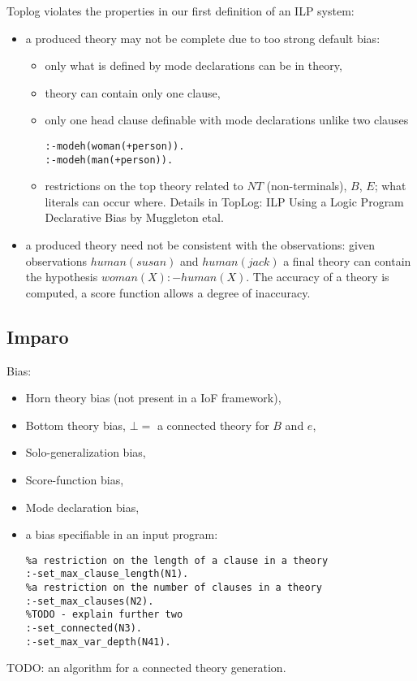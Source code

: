 Toplog violates the properties in our first definition of an ILP system:
\begin{itemize}
\item a produced theory may not be complete due to too strong default bias:
\begin{itemize}
\item only what is defined by mode declarations can be in theory,
\item theory can contain only one clause,
\item only one head clause definable with mode declarations unlike two clauses
\begin{lstlisting}
:-modeh(woman(+person)).
:-modeh(man(+person)).
\end{lstlisting}

\item restrictions on the top theory related to $NT$ (non-terminals), $B$, $E$; what literals can occur where. Details in TopLog: ILP Using a Logic Program Declarative Bias by Muggleton etal.
\end{itemize}
\item a produced theory need not be consistent with the observations: given observations $human(susan)$ and $human(jack)$ a final theory can contain the hypothesis $woman(X) :- human(X)$. The accuracy of a theory is computed, a score function allows a degree of inaccuracy.
\end{itemize}

\iffalse
\subsection{ProGolem}
\begin{itemize}
\item Inverse Entailment,
\item co-generalization, 
\end{itemize}
\fi

\subsection{Imparo\cite{kimber2009}}
Bias:
\begin{itemize}
\item Horn theory bias (not present in a IoF framework),
\item Bottom theory bias, $\bot=$ a connected theory for $B$ and $e$,
\item Solo-generalization bias,
\item Score-function bias,
\item Mode declaration bias,
\item a bias specifiable in an input program:
\begin{lstlisting}
%a restriction on the length of a clause in a theory
:-set_max_clause_length(N1).
%a restriction on the number of clauses in a theory
:-set_max_clauses(N2).
%TODO - explain further two
:-set_connected(N3).
:-set_max_var_depth(N41).
\end{lstlisting}
\end{itemize}
TODO: an algorithm for a connected theory generation.

